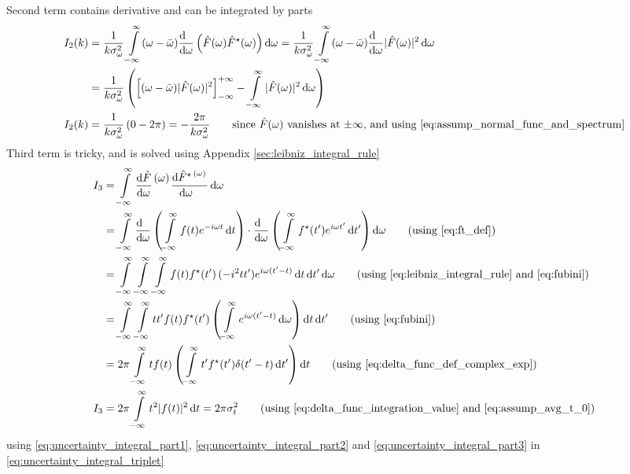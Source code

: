 \documentclass[11pt, a4paper]{article}
\newcommand{\numerator}[1]{\genfrac{}{}{0pt}{}{#1}{}}
\newcommand{\eqrefnp}[1]{\textup{\ref{#1}}}
\newcommand{\primed}[1]{#1^{\prime}}
\newcommand{\tp}{\primed{t}}	%
\newcommand{\variance}[1]{\sigma_{#1}^{2}}
\newcommand{\diff}{\mathop{}\!\mathrm{d}}
\newcommand{\dt}{\diff t}
\newcommand{\dtp}{\diff \tp}
\newcommand{\domega}{\diff \omega}
\newcommand{\derv}[1]{\frac{\diff \hfill}{\diff #1}}	%
\newcommand{\dervb}[2]{\derv{#1} \left(#2\right)}  %
\newcommand{\dervf}[2]{\frac{\diff #2}{\diff #1 \hfil}}	%
\newcommand{\dint}[2]{\int \limits_{#1}^{#2}}  %
\newcommand{\intinfty}{\dint{-\infty}{\infty}}	%
\newcommand{\iintinfty}{\intinfty \intinfty}	%
\newcommand{\iiintinfty}{\intinfty \intinfty \intinfty}	%
\begin{document}
Second term contains derivative and can be integrated by parts 
\begin{align}
	I_{2}(k) & = \frac{1}{k \variance{\omega}} \intinfty (\omega - \bar{\omega}) \dervb{\omega}{\hat{F}(\omega) \hat{F}^{\star}(\omega)} \domega = \frac{1}{k \variance{\omega}} \intinfty (\omega - \bar{\omega}) \derv{\omega}|\hat{F}(\omega)|^{2} \domega \nonumber \\
	& = \frac{1}{k \variance{\omega}} \left(\left[(\omega - \bar{\omega})|\hat{F}(\omega)|^{2}\right]_{-\infty}^{+\infty} - \intinfty |\hat{F}(\omega)|^{2} \domega \right) \nonumber \\
	I_{2}(k) & = \frac{1}{k \variance{\omega}} \left(0 - 2\pi \right) = -\frac{2\pi}{k \variance{\omega}} \qquad \text{since $\hat{F}(\omega)$ vanishes at $\pm\infty$, and using \eqref{eq:assump_normal_func_and_spectrum}} \label{eq:uncertainty_integral_part2}
\end{align}
Third term is tricky, and is solved using Appendix \ref{sec:leibniz_integral_rule}
\begin{align}
	I_{3} & = \intinfty \dervf{\omega}{\hat{F}}\numerator{(\omega)} \dervf{\omega}{\hat{F}^{\star}\numerator{(\omega)}} \domega \nonumber \\
	& = \intinfty \dervb{\omega}{\intinfty f(t)e^{-i \omega t} \dt} \cdot \dervb{\omega}{\intinfty f^{\star}(\tp)e^{i \omega \tp} \dtp} \domega \nonumber \tag{using \eqrefnp{eq:ft_def}} \\
	& =  \iiintinfty f(t)f^{\star}(\tp)\,(-i^{2}t \tp)e^{i \omega (\tp - t)} \dt \dtp \domega
	\nonumber \tag{using \eqrefnp{eq:leibniz_integral_rule} and \eqrefnp{eq:fubini}} \\
	& = \iintinfty t \tp f(t)f^{\star}(\tp) \left(\intinfty e^{i \omega (\tp - t)} \domega \right) \dt \dtp \nonumber \tag{using \eqrefnp{eq:fubini}} \\
	& = 2 \pi \intinfty t f(t) \left(\intinfty \tp f^{\star}(\tp) \delta(\tp - t) \dtp \right) \dt  \nonumber \tag{using \eqrefnp{eq:delta_func_def_complex_exp}} \\
	I_{3} & = 2 \pi \intinfty t^{2} |f(t)|^{2} \dt = 2 \pi \variance{t}  \qquad \text{(using \eqrefnp{eq:delta_func_integration_value} and \eqrefnp{eq:assump_avg_t_0})} \label{eq:uncertainty_integral_part3}
\end{align}
using \eqref{eq:uncertainty_integral_part1}, \eqref{eq:uncertainty_integral_part2} and \eqref{eq:uncertainty_integral_part3} in \eqref{eq:uncertainty_integral_triplet}
\end{document}
